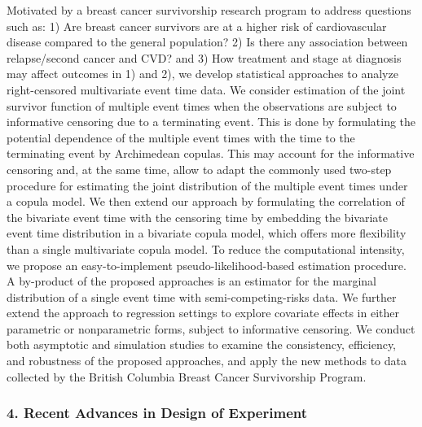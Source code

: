 \begin{itemize}
Motivated by a breast cancer survivorship research program to address questions such as: 1) Are breast cancer survivors are at a higher risk of cardiovascular disease compared to the general population? 2) Is there any association between relapse/second cancer and CVD? and 3) How treatment and stage at diagnosis may affect outcomes in 1) and 2), we develop statistical approaches to analyze right-censored multivariate event time data. We consider estimation of the joint survivor function of multiple event times when the observations are subject to informative censoring due to a terminating event. This is done by formulating the potential dependence of the multiple event times with the time to the terminating event by Archimedean copulas. This may account for the informative censoring and, at the same time, allow to adapt the commonly used two-step procedure for estimating the joint distribution of the multiple event times under a copula model. We then extend our approach by formulating the correlation of the bivariate event time with the censoring time by embedding the bivariate event time distribution in a bivariate copula model, which offers more flexibility than a single multivariate copula model. To reduce the computational intensity, we propose an easy-to-implement pseudo-likelihood-based estimation procedure. A by-product of the proposed approaches is an estimator for the marginal distribution of a single event time with semi-competing-risks data. We further extend the approach to regression settings to explore covariate effects in either parametric or nonparametric forms, subject to informative censoring. We conduct both asymptotic and simulation studies to examine the consistency, efficiency, and robustness of the proposed approaches, and apply the new methods to data collected by the British Columbia Breast Cancer Survivorship Program.

\end{itemize}

\subsubsection*{4. Recent Advances in Design of Experiment}

